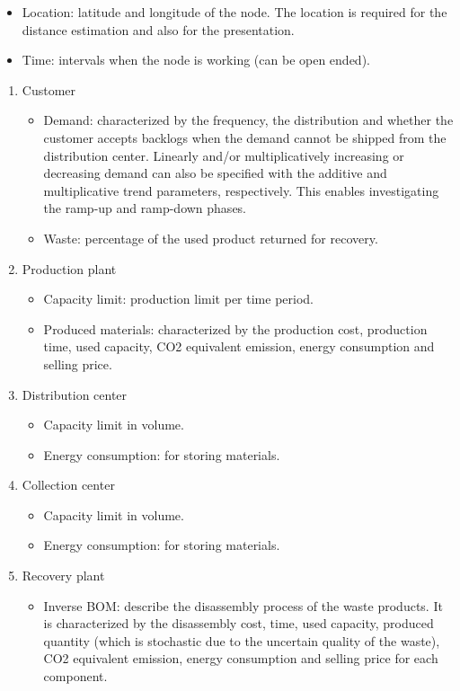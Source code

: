 \documentclass{article}
\begin{document}
\begin{itemize}
\item Location: latitude and longitude of the node. The location is required for the distance estimation and also for the presentation.
\item Time: intervals when the node is working (can be open ended).
\end{itemize}
\begin{enumerate}
\item Customer
	\begin{itemize}
	\item Demand: characterized by the frequency, the distribution and whether the customer accepts backlogs when the demand cannot be shipped from the distribution center. Linearly and/or multiplicatively increasing or decreasing demand can also be specified with the additive and multiplicative trend parameters, respectively. This enables investigating the ramp-up and ramp-down phases.
	\item Waste: percentage of the used product returned for recovery.
	\end{itemize}
\item Production plant
	\begin{itemize}
	\item Capacity limit: production limit per time period.
	\item Produced materials: characterized by the production cost, production time, used capacity, CO2 equivalent emission, energy consumption and selling price.
	\end{itemize}
\item Distribution center
	\begin{itemize}
	\item Capacity limit in volume.
	\item Energy consumption: for storing materials.
	\end{itemize}
\item Collection center
	\begin{itemize}
	\item Capacity limit in volume.
	\item Energy consumption: for storing materials.
	\end{itemize}
\item Recovery plant
	\begin{itemize}
	\item Inverse BOM: describe the disassembly process of the waste products. It is characterized by the disassembly cost, time, used capacity, produced quantity (which is stochastic due to the uncertain quality of the waste), CO2 equivalent emission, energy consumption and selling price for each component.
	\end{itemize}
\end{enumerate}
\end{document}
